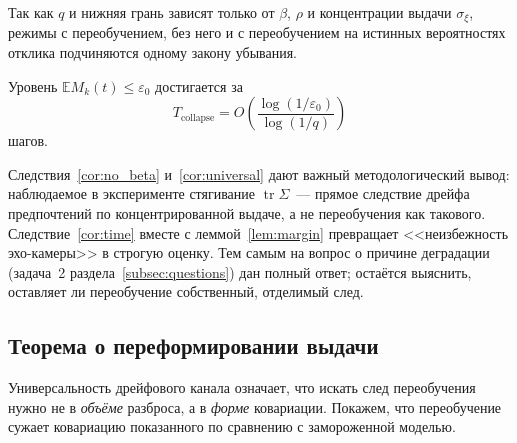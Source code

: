 \begin{corollary}
\label{cor:universal}
Так как $q$ и нижняя грань зависят только от $\beta$, $\rho$ и
концентрации выдачи $\sigma_\xi$, режимы с переобучением, без него и с
переобучением на истинных вероятностях отклика подчиняются одному закону
убывания.
\end{corollary}

\begin{corollary}
\label{cor:time}
Уровень $\mathbb E M_k(t)\le\varepsilon_0$ достигается за
\[
    T_{\mathrm{collapse}}
    =O\!\left(\frac{\log(1/\varepsilon_0)}{\log(1/q)}\right)
\]
шагов.
\end{corollary}

Следствия~\ref{cor:no_beta} и~\ref{cor:universal} дают важный методологический
вывод: наблюдаемое в эксперименте стягивание $\operatorname{tr}\Sigma$~---
прямое следствие дрейфа предпочтений по концентрированной выдаче, а не
переобучения как такового. Следствие~\ref{cor:time} вместе с
леммой~\ref{lem:margin} превращает <<неизбежность эхо-камеры>> в строгую оценку.
Тем самым на вопрос о причине деградации (задача~2
раздела~\ref{subsec:questions}) дан полный ответ; остаётся выяснить, оставляет ли
переобучение собственный, отделимый след.

\subsection{Теорема о переформировании выдачи}
\label{subsec:thm2}

Универсальность дрейфового канала означает, что искать след переобучения нужно
не в \emph{объёме} разброса, а в \emph{форме} ковариации. Покажем, что
переобучение сужает ковариацию показанного по сравнению с замороженной моделью.

